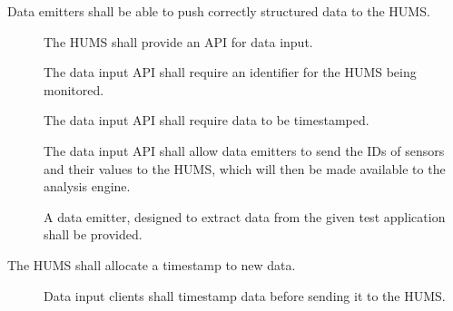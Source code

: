\begin{description}[leftmargin=1.3cm, itemsep=0.3cm]
  	\item[\fr{1}]  Data emitters shall be able to push correctly structured data 	to the HUMS.
	\begin{description}
		 \item[] The HUMS shall provide an API for data input.

		  \item[] The data input API shall require an identifier for
 		 the HUMS being monitored.

 		 \item[] The data input API shall require data to be
 		 timestamped.

 		 \item[] The data input API shall allow data emitters
 		 to send the IDs of sensors and their values to the HUMS, which will 			then be made available to the analysis engine.

 		 \item[] A data emitter, designed to extract data from the given 		test application shall be provided.
	\end{description}
	\item[\fr{2}]  The HUMS shall allocate a timestamp to new data.
	\begin{description}
	 	 \item[]Data input clients shall timestamp data before
 		sending it to the HUMS.
		

\end{description}
\end{description}
